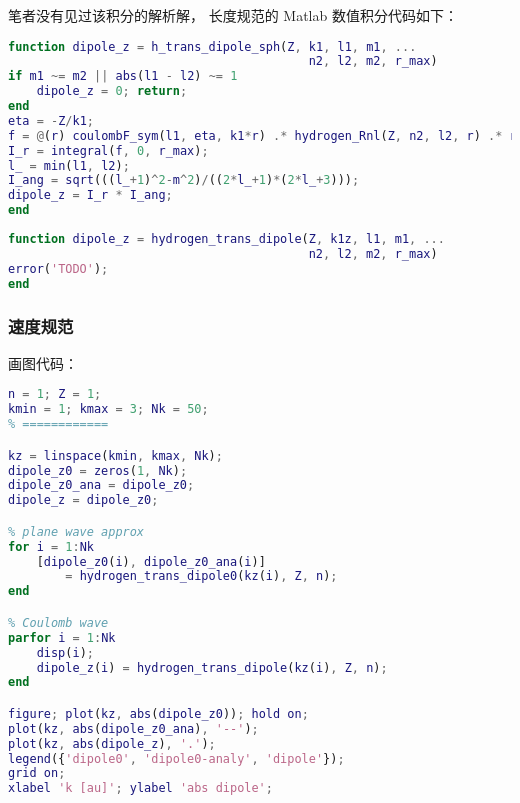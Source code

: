 笔者没有见过该积分的解析解， 长度规范的 Matlab 数值积分代码如下：
\begin{lstlisting}[language=matlab, caption=hydrogen\_trans\_dipole\_sph.m]
% <C_{l1,m1}(k1)|z|n2,l2,m2>
function dipole_z = h_trans_dipole_sph(Z, k1, l1, m1, ...
                                          n2, l2, m2, r_max)
if m1 ~= m2 || abs(l1 - l2) ~= 1
    dipole_z = 0; return;
end
eta = -Z/k1;
f = @(r) coulombF_sym(l1, eta, k1*r) .* hydrogen_Rnl(Z, n2, l2, r) .* r.^2;
I_r = integral(f, 0, r_max);
l_ = min(l1, l2);
I_ang = sqrt(((l_+1)^2-m^2)/((2*l_+1)*(2*l_+3)));
dipole_z = I_r * I_ang;
end
\end{lstlisting}

\begin{lstlisting}[language=matlab, caption=hydrogen\_trans\_dipole.m]
function dipole_z = hydrogen_trans_dipole(Z, k1z, l1, m1, ...
                                          n2, l2, m2, r_max)
error('TODO');
end
\end{lstlisting}

\subsubsection{速度规范}

画图代码：
\begin{lstlisting}[language=matlab,caption=plot\_hydrogen\_trans\_dipole.m]
% == params ==
n = 1; Z = 1;
kmin = 1; kmax = 3; Nk = 50;
% ============

kz = linspace(kmin, kmax, Nk);
dipole_z0 = zeros(1, Nk);
dipole_z0_ana = dipole_z0;
dipole_z = dipole_z0;

% plane wave approx
for i = 1:Nk
    [dipole_z0(i), dipole_z0_ana(i)]
        = hydrogen_trans_dipole0(kz(i), Z, n);
end

% Coulomb wave
parfor i = 1:Nk
    disp(i);
    dipole_z(i) = hydrogen_trans_dipole(kz(i), Z, n);
end

figure; plot(kz, abs(dipole_z0)); hold on;
plot(kz, abs(dipole_z0_ana), '--');
plot(kz, abs(dipole_z), '.');
legend({'dipole0', 'dipole0-analy', 'dipole'});
grid on;
xlabel 'k [au]'; ylabel 'abs dipole';
\end{lstlisting}
